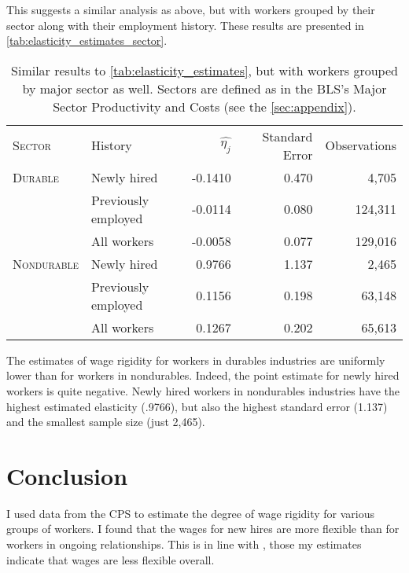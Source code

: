 \documentclass[11pt]{article}
\begin{document}
This suggests a similar analysis as above, but with workers grouped by their sector along with their employment history.
These results are presented in \autoref{tab:elasticity_estimates_sector}.

\begin{table}
    \centering
    \begin{tabular}{llrrr} \toprule
       \textsc{Sector}     & History              & $\hat{\eta_j}$ & Standard Error   & Observations\\
       \textsc{Durable}    & Newly hired          & -0.1410         & 0.470            & 4,705       \\
                  & Previously employed  & -0.0114         & 0.080            & 124,311     \\
                  & All workers          & -0.0058         & 0.077            & 129,016     \\
       \textsc{Nondurable} & Newly hired          & 0.9766          & 1.137            & 2,465       \\
                  & Previously employed  & 0.1156          & 0.198            & 63,148      \\
                  & All workers          & 0.1267          & 0.202            & 65,613      \\ \bottomrule
    \end{tabular}
    \caption{
                Similar results to \autoref{tab:elasticity_estimates}, but with workers grouped by major sector as well. Sectors are defined as in the BLS's Major Sector Productivity and Costs (see the \autoref{sec:appendix}).
            }
    \label{tab:elasticity_estimates_sector}
\end{table}

The estimates of wage rigidity for workers in durables industries are uniformly lower than for workers in nondurables.
Indeed, the point estimate for newly hired workers is quite negative.
Newly hired workers in nondurables industries have the highest estimated elasticity (.9766), but also the highest standard error (1.137) and the smallest sample size (just 2,465).

\newpage
\section{Conclusion}

I used data from the CPS to estimate the degree of wage rigidity for various groups of workers.
I found that the wages for new hires are more flexible than for workers in ongoing relationships.
This is in line with \cite{haefke_sonntag_vanRens_2013}, those my estimates indicate that wages are less flexible overall.
\end{document}
